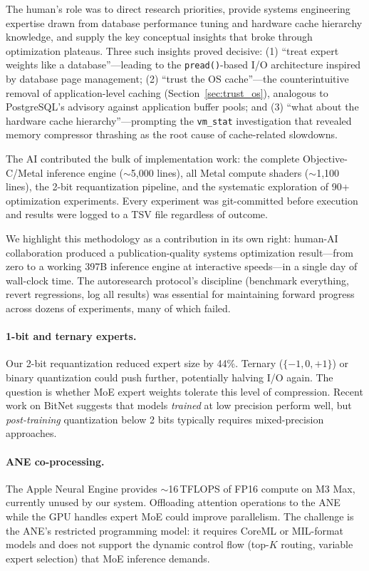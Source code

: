 \documentclass[11pt,twocolumn]{article}
\begin{document}
The human's role was to direct research priorities, provide systems engineering expertise drawn from database performance tuning and hardware cache hierarchy knowledge, and supply the key conceptual insights that broke through optimization plateaus.
Three such insights proved decisive: (1) ``treat expert weights like a database''---leading to the \texttt{pread()}-based I/O architecture inspired by database page management; (2) ``trust the OS cache''---the counterintuitive removal of application-level caching (Section~\ref{sec:trust_os}), analogous to PostgreSQL's advisory against application buffer pools; and (3) ``what about the hardware cache hierarchy''---prompting the \texttt{vm\_stat} investigation that revealed memory compressor thrashing as the root cause of cache-related slowdowns.

The AI contributed the bulk of implementation work: the complete Objective-C/Metal inference engine ($\sim$5{,}000 lines), all Metal compute shaders ($\sim$1{,}100 lines), the 2-bit requantization pipeline, and the systematic exploration of 90+ optimization experiments.
Every experiment was git-committed before execution and results were logged to a TSV file regardless of outcome.

We highlight this methodology as a contribution in its own right: human-AI collaboration produced a publication-quality systems optimization result---from zero to a working 397B inference engine at interactive speeds---in a single day of wall-clock time.
The autoresearch protocol's discipline (benchmark everything, revert regressions, log all results) was essential for maintaining forward progress across dozens of experiments, many of which failed.

\paragraph{1-bit and ternary experts.}
Our 2-bit requantization reduced expert size by 44\%.
Ternary ($\{-1, 0, +1\}$) or binary quantization could push further, potentially halving I/O again.
The question is whether MoE expert weights tolerate this level of compression.
Recent work on BitNet suggests that models \emph{trained} at low precision perform well, but \emph{post-training} quantization below 2 bits typically requires mixed-precision approaches.

\paragraph{ANE co-processing.}
The Apple Neural Engine provides $\sim$16\,TFLOPS of FP16 compute on M3 Max, currently unused by our system.
Offloading attention operations to the ANE while the GPU handles expert MoE could improve parallelism.
The challenge is the ANE's restricted programming model: it requires CoreML or MIL-format models and does not support the dynamic control flow (top-$K$ routing, variable expert selection) that MoE inference demands.
\end{document}
